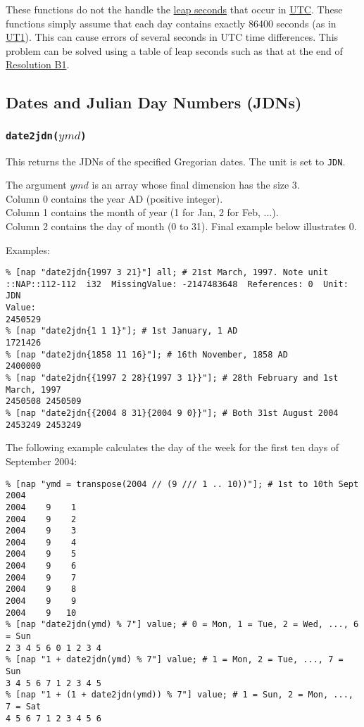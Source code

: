 These functions do not the handle the 
      \href{http://tycho.usno.navy.mil/leapsec.html}{leap seconds} that occur in 
      \href{http://tycho.usno.navy.mil/systime.html}{UTC}. These
      functions simply assume that each day contains exactly 86400
      seconds (as in 
      \href{http://tycho.usno.navy.mil/systime.html}{UT1}). This
      can cause errors of several seconds in UTC time differences. This
      problem can be solved using a table of leap seconds such as that
      at the end of 
      \href{http://www.iers.org/iers/earth/resolutions/UAI-b1.html}{Resolution B1}.

\subsection{Dates and Julian Day Numbers (JDNs)}
        \label{date-function-jdn}

\subsubsection{\texttt{date2jdn(}$ymd$\texttt{)}}
        \label{date-function-date2jdn} 

This returns the JDNs of the specified Gregorian dates. The
      unit is set to 
      \texttt{JDN}.
      

The argument 
      $ymd$ is an array whose final dimension has the size 3.
      \\Column 0 contains the year AD (positive integer).
      \\Column 1 contains the month of year (1 for Jan, 2 for Feb,
      ...).
      \\Column 2 contains the day of month (0 to 31). Final example
      below illustrates 0.
      

Examples:
      \begin{verbatim}
% [nap "date2jdn{1997 3 21}"] all; # 21st March, 1997. Note unit
::NAP::112-112  i32  MissingValue: -2147483648  References: 0  Unit: JDN
Value:
2450529
% [nap "date2jdn{1 1 1}"]; # 1st January, 1 AD
1721426
% [nap "date2jdn{1858 11 16}"]; # 16th November, 1858 AD
2400000
% [nap "date2jdn{{1997 2 28}{1997 3 1}}"]; # 28th February and 1st March, 1997
2450508 2450509
% [nap "date2jdn{{2004 8 31}{2004 9 0}}"]; # Both 31st August 2004
2453249 2453249
\end{verbatim}

The following example calculates the day of the week for the
      first ten days of September 2004:
      \begin{verbatim}
% [nap "ymd = transpose(2004 // (9 /// 1 .. 10))"]; # 1st to 10th Sept 2004
2004    9    1
2004    9    2
2004    9    3
2004    9    4
2004    9    5
2004    9    6
2004    9    7
2004    9    8
2004    9    9
2004    9   10
% [nap "date2jdn(ymd) % 7"] value; # 0 = Mon, 1 = Tue, 2 = Wed, ..., 6 = Sun
2 3 4 5 6 0 1 2 3 4
% [nap "1 + date2jdn(ymd) % 7"] value; # 1 = Mon, 2 = Tue, ..., 7 = Sun
3 4 5 6 7 1 2 3 4 5
% [nap "1 + (1 + date2jdn(ymd)) % 7"] value; # 1 = Sun, 2 = Mon, ..., 7 = Sat
4 5 6 7 1 2 3 4 5 6
\end{verbatim}

